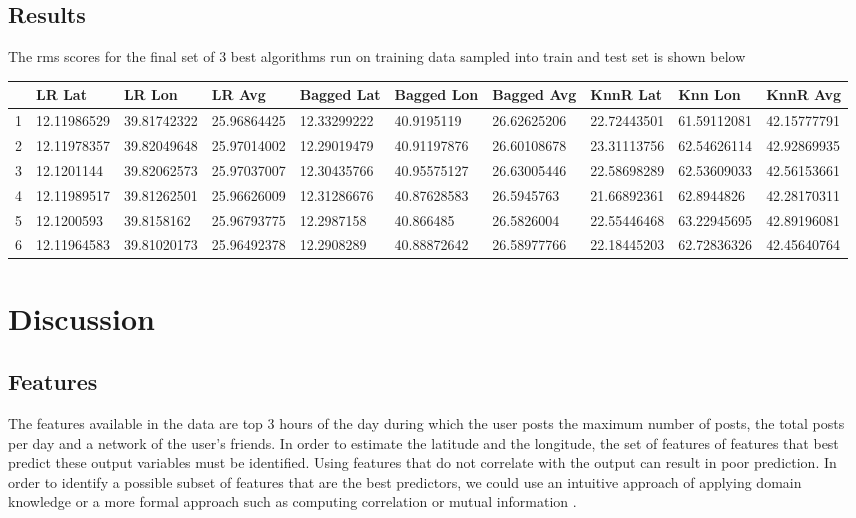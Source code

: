 \subsection{Results}
The rms scores  for the final set of 3 best algorithms run on training data sampled into train and test set is shown below

\begin{footnotesize}
\begin{tabular}{llllllllll}

\toprule
 & LR Lat & LR Lon & LR Avg & Bagged Lat & Bagged Lon & Bagged Avg & KnnR Lat & Knn  Lon & KnnR Avg \\
\midrule
1 & 12.11986529 & 39.81742322 & 25.96864425 & 12.33299222 & 40.9195119 & 26.62625206 & 22.72443501 & 61.59112081 & 42.15777791 \\
2 & 12.11978357 & 39.82049648 & 25.97014002 & 12.29019479 & 40.91197876 & 26.60108678 & 23.31113756 & 62.54626114 & 42.92869935 \\
3 & 12.1201144 & 39.82062573 & 25.97037007 & 12.30435766 & 40.95575127 & 26.63005446 & 22.58698289 & 62.53609033 & 42.56153661 \\
4 & 12.11989517 & 39.81262501 & 25.96626009 & 12.31286676 & 40.87628583 & 26.5945763 & 21.66892361 & 62.8944826 & 42.28170311 \\
5 & 12.1200593 & 39.8158162 & 25.96793775 & 12.2987158 & 40.866485 & 26.5826004 & 22.55446468 & 63.22945695 & 42.89196081 \\
6 & 12.11964583 & 39.81020173 & 25.96492378 & 12.2908289 & 40.88872642 & 26.58977766 & 22.18445203 & 62.72836326 & 42.45640764 \\
\bottomrule
\end{tabular}
\end{footnotesize}



\section{Discussion}

\subsection{Features}
The features available in the data are top 3 hours of the day during which the user posts the maximum number of posts, the total posts per day and  a network of the user's friends. In order to estimate the latitude and the longitude, the set of features of features that best predict these output variables must be identified.  Using features that do not correlate with the output can result in poor prediction.  In order to  identify a possible subset of features that are the best predictors, we could use an intuitive approach of applying  domain knowledge or a more formal approach such as computing correlation or mutual information \cite{Guyon2003}.




